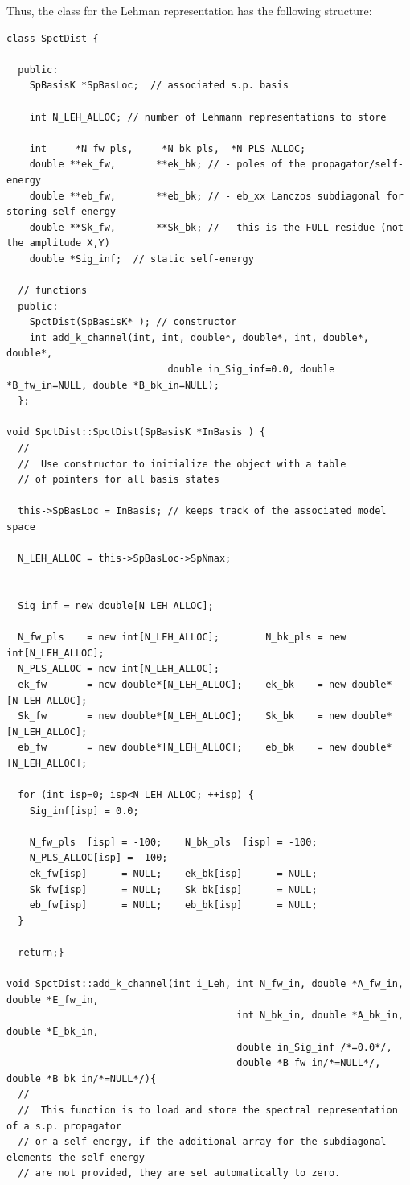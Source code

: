 %
Thus, the class for the Lehman representation has  the following structure:
\lstset{language=c++}
\begin{lstlisting}
class SpctDist {

  public:
    SpBasisK *SpBasLoc;  // associated s.p. basis
    
    int N_LEH_ALLOC; // number of Lehmann representations to store
  
    int     *N_fw_pls,     *N_bk_pls,  *N_PLS_ALLOC;
    double **ek_fw,       **ek_bk; // - poles of the propagator/self-energy
    double **eb_fw,       **eb_bk; // - eb_xx Lanczos subdiagonal for storing self-energy
    double **Sk_fw,       **Sk_bk; // - this is the FULL residue (not the amplitude X,Y)
    double *Sig_inf;  // static self-energy

  // functions
  public:
    SpctDist(SpBasisK* ); // constructor
    int add_k_channel(int, int, double*, double*, int, double*, double*,
                            double in_Sig_inf=0.0, double *B_fw_in=NULL, double *B_bk_in=NULL);
  };

void SpctDist::SpctDist(SpBasisK *InBasis ) {
  //
  //  Use constructor to initialize the object with a table
  // of pointers for all basis states
  
  this->SpBasLoc = InBasis; // keeps track of the associated model space

  N_LEH_ALLOC = this->SpBasLoc->SpNmax;


  Sig_inf = new double[N_LEH_ALLOC];

  N_fw_pls    = new int[N_LEH_ALLOC];        N_bk_pls = new int[N_LEH_ALLOC];
  N_PLS_ALLOC = new int[N_LEH_ALLOC];
  ek_fw       = new double*[N_LEH_ALLOC];    ek_bk    = new double*[N_LEH_ALLOC];
  Sk_fw       = new double*[N_LEH_ALLOC];    Sk_bk    = new double*[N_LEH_ALLOC];
  eb_fw       = new double*[N_LEH_ALLOC];    eb_bk    = new double*[N_LEH_ALLOC];
  
  for (int isp=0; isp<N_LEH_ALLOC; ++isp) {
    Sig_inf[isp] = 0.0;
    
    N_fw_pls  [isp] = -100;    N_bk_pls  [isp] = -100;
    N_PLS_ALLOC[isp] = -100;
    ek_fw[isp]      = NULL;    ek_bk[isp]      = NULL;
    Sk_fw[isp]      = NULL;    Sk_bk[isp]      = NULL;
    eb_fw[isp]      = NULL;    eb_bk[isp]      = NULL;
  }
  
  return;}

void SpctDist::add_k_channel(int i_Leh, int N_fw_in, double *A_fw_in, double *E_fw_in,
                                        int N_bk_in, double *A_bk_in, double *E_bk_in,
                                        double in_Sig_inf /*=0.0*/,
                                        double *B_fw_in/*=NULL*/, double *B_bk_in/*=NULL*/){
  //
  //  This function is to load and store the spectral representation of a s.p. propagator
  // or a self-energy, if the additional array for the subdiagonal elements the self-energy
  // are not provided, they are set automatically to zero.


\end{lstlisting}
